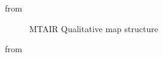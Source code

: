 \documentclass[
  11pt,
  letterpaper,
]{book}
\begin{document}
from \textcite{clarke2022}

\begin{figure}


\caption[MTAIR Qualitative map
structure]{\label{fig-mtair-qual-map}MTAIR Qualitative map structure}

\end{figure}%

from \textcite{cottier2019}
\end{document}
